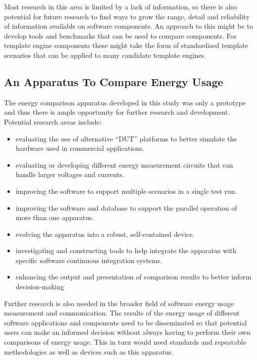 Most research in this area is limited by a lack of information, so there is also potential for future research to find ways to grow the range, detail and reliability of information available on software components. An approach to this might be to develop tools and benchmarks that can be used to compare components. For \gls{template engine} components these might take the form of standardised template scenarios that can be applied to many candidate \gls{template engine}s.

\subsection{An Apparatus To Compare Energy Usage}

The energy comparison apparatus developed in this study was only a prototype and thus there is ample opportunity for further research and development. Potential research areas include:

\begin{itemize}
    \item evaluating the use of alternative \enquote{DUT} platforms to better simulate the hardware used in commercial applications.
    \item evaluating or developing different energy measurement circuits that can handle larger voltages and currents.
    \item improving the software to support multiple scenarios in a single test run.
    \item improving the software and database to support the parallel operation of more than one apparatus.
    \item evolving the apparatus into a robust, self-contained device.
    \item investigating and constructing tools to help integrate the apparatus with specific software \gls{continuous integration} systems.
    \item enhancing the output and presentation of comparison results to better inform decision-making
\end{itemize}

Further research is also needed in the broader field of software energy usage measurement and communication. The results of the energy usage of different software applications and components need to be disseminated so that potential users can make an informed decision without always having to perform their own comparisons of energy usage. This in turn would need standards and repeatable methodologies as well as devices such as this apparatus.

